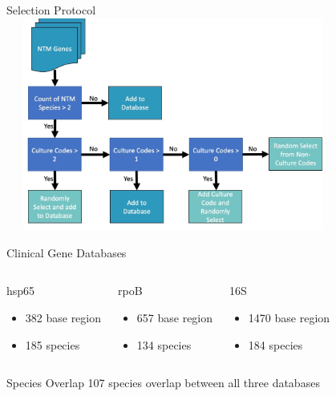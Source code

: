 \documentclass[11pt]{beamer}
\begin{document}
  \begin{frame}{Selection Protocol}
  \center
  \includegraphics[height=7cm, width=11cm]{CPBS_11_18/Selection_Protocol.jpg}
  \end{frame}
  \begin{frame}{Clinical Gene Databases}
  \begin{columns}
  \begin{block}{hsp65}
  \begin{itemize}
  \item 382 base region  
  \item 185 species
  \end{itemize}
  \end{block}
  
  
  \begin{block}{rpoB}
  \begin{itemize}
  \item 657 base region
  \item 134 species
  \end{itemize}
  \end{block}
  
  \begin{block}{16S}
  \begin{itemize}
  \item 1470 base region
  \item 184 species
  \end{itemize}
  \end{block}

  \end{columns}
  \begin{block}{Species Overlap}
  107 species overlap between all three databases
  \end{block}
  
  \end{frame}
	
\end{document}
